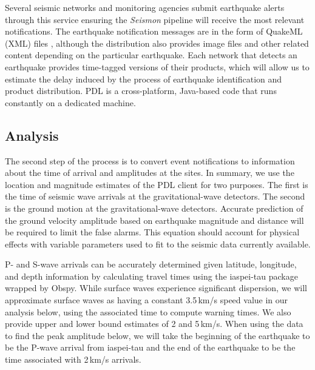\documentclass[twocolumn, aps, superscriptaddress]{revtex4}
\begin{document}
Several seismic networks and monitoring agencies submit earthquake alerts through this service ensuring the \emph{Seismon} pipeline will receive the most relevant notifications. The earthquake notification messages are in the form of QuakeML (XML) files \cite{ScEu2011}, although the distribution also provides image files and other related content depending on the particular earthquake. Each network that detects an earthquake provides time-tagged versions of their products, which will allow us to estimate the delay induced by the process of earthquake identification and product distribution. PDL is a cross-platform, Java-based code that runs constantly on a dedicated machine.

\subsection{Analysis}
\label{subsec:analysis}

The second step of the process is to convert event notifications to information about the time of arrival and amplitudes at the sites.
In summary, we use the location and magnitude estimates of the PDL client for two purposes. 
The first is the time of seismic wave arrivals at the gravitational-wave detectors.
The second is the ground motion at the gravitational-wave detectors.
Accurate prediction of the ground velocity amplitude based on earthquake magnitude and distance will be required to limit the false alarms. 
This equation should account for physical effects with variable parameters used to fit to the seismic data currently available.

P- and S-wave arrivals can be accurately determined given latitude, longitude, and depth information by calculating travel times using the iaspei-tau package \cite{Snoke2009} wrapped by Obspy. While surface waves experience significant dispersion, we will approximate surface waves as having a constant 3.5\,km/s speed value in our analysis below, using the associated time to compute warning times. We also provide upper and lower bound estimates of 2 and 5\,km/s. When using the data to find the peak amplitude below, we will take the beginning of the earthquake to be the P-wave arrival from iaspei-tau and the end of the earthquake to be the time associated with 2\,km/s arrivals.
\end{document}
